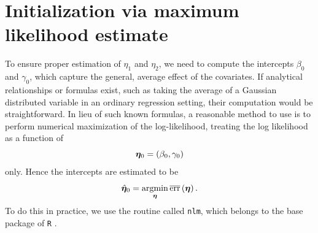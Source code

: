 \section{Initialization via maximum likelihood estimate}
To ensure proper estimation of $\eta_1$ and $\eta_2$, we need to compute the intercepts $\beta_{0}$ and $\gamma_{0}$, which capture the general, average effect of the covariates.
If analytical relationships or formulas exist, such as taking the average of a Gaussian distributed variable in an ordinary regression setting, their computation would be straightforward.
In lieu of such known formulas, a reasonable method to use is to perform numerical maximization of the log-likelihood, treating the log likelihood as a function of
\begin{equation*}
    \boldsymbol{\eta}_0=\left(\beta_{0},\gamma_{0}\right)
\end{equation*}
only.
Hence the intercepts are estimated to be
\begin{equation*}
    \hat{\boldsymbol{\eta}}_0=\operatorname*{argmin}_{\boldsymbol{\eta}}\overline{\text{err}}\left(\boldsymbol{\eta}\right).
\end{equation*}
To do this in practice, we use the routine called \verb|nlm|, which belongs to the base package of \verb|R| \citep{Rlang}.

